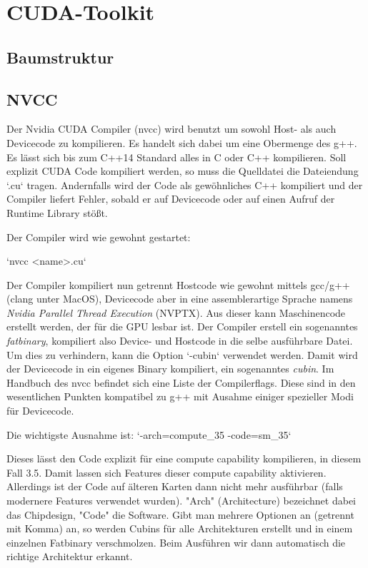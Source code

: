 		\section{CUDA-Toolkit}
			\subsection{Baumstruktur}
			\subsection{NVCC}
			Der Nvidia CUDA Compiler (\gls{nvcc}) wird benutzt um sowohl Host- als auch Devicecode zu kompilieren. Es handelt sich dabei um eine Obermenge des g++. Es lässt sich bis zum C++14 Standard alles in C oder C++ kompilieren. Soll explizit CUDA Code kompiliert werden, so muss die Quelldatei die Dateiendung \li`.cu` tragen. Andernfalls wird der Code als gewöhnliches C++ kompiliert und der Compiler liefert Fehler, sobald er auf Devicecode oder auf einen Aufruf der Runtime Library stößt.
		
			Der Compiler wird wie gewohnt gestartet:
		
			\li`nvcc <name>.cu`
		
			Der Compiler kompiliert nun getrennt Hostcode wie gewohnt mittels gcc/g++ (clang unter MacOS), Devicecode aber in eine assemblerartige Sprache namens \textit{Nvidia Parallel Thread Execution} (\Gls{NVPTX}). Aus dieser kann Maschinencode erstellt werden, der für die GPU lesbar ist. Der Compiler erstell ein sogenanntes \textit{fatbinary}, kompiliert also Device- und Hostcode in die selbe ausführbare Datei. Um dies zu verhindern, kann die Option \li`-cubin` verwendet werden. Damit wird der Devicecode in ein eigenes Binary kompiliert, ein sogenanntes \textit{cubin}. Im Handbuch des \gls{nvcc} \autocite{cudaNVCC} befindet sich eine Liste der Compilerflags. Diese sind in den wesentlichen Punkten kompatibel zu g++ mit Ausahme einiger spezieller Modi für Devicecode.
		
			Die wichtigste Ausnahme ist: \li`-arch=compute_35 -code=sm_35`
		
			Dieses lässt den Code explizit für eine \gls{compute capability} kompilieren, in diesem Fall 3.5. Damit lassen sich Features dieser \gls{compute capability} aktivieren. Allerdings ist der Code auf älteren Karten dann nicht mehr ausführbar (falls modernere Features verwendet wurden). "Arch" (Architecture) bezeichnet dabei das Chipdesign, "Code" die Software. Gibt man mehrere Optionen an (getrennt mit Komma) an, so werden Cubins für alle Architekturen erstellt und in einem einzelnen Fatbinary verschmolzen. Beim Ausführen wir dann automatisch die richtige Architektur erkannt.
		
